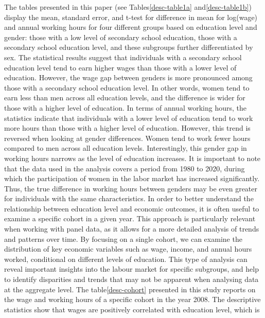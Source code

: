 \documentclass[12pt]{article}
\begin{document}
The tables presented in this paper (see Tables\ref{desc-table1a} and\ref{desc-table1b}) display the mean, standard
error, and t-test for difference in mean for log(wage) and annual working hours for four different groups based on
education level and gender: those with a low level of secondary school education, those with a secondary school
education level, and these subgroups further differentiated by sex. The statistical results suggest that individuals
with a secondary school education level tend to earn higher wages than those with a lower level of education. However,
the wage gap between genders is more pronounced among those with a secondary school education level. In other words,
women tend to earn less than men across all education levels, and the difference is wider for those with a higher level
of education.
\newline
In terms of annual working hours, the statistics indicate that individuals with a lower level of education tend to work
more hours than those with a higher level of education. However, this trend is reversed when looking at gender
differences. Women tend to work fewer hours compared to men across all education levels. Interestingly, this gender gap
in working hours narrows as the level of education increases. It is important to note that the data used in the analysis
covers a period from 1980 to 2020, during which the participation of women in the labor market has increased
significantly. Thus, the true difference in working hours between genders may be even greater for individuals with the
same characteristics.\newline
In order to better understand the relationship between education level and economic outcomes, it is often useful to
examine a specific cohort in a given year. This approach is particularly relevant when working with panel data, as it
allows for a more detailed analysis of trends and patterns over time. By focusing on a single cohort, we can examine the
distribution of key economic variables such as wage, income, and annual hours worked, conditional on different levels of
education. This type of analysis can reveal important insights into the labour market for specific subgroups, and help
to identify disparities and trends that may not be apparent when analysing data at the aggregate level.
\newline
The table\ref{desc-cohort} presented in this study reports on the wage and working hours of a specific cohort in the
year 2008. The descriptive statistics show that wages are positively correlated with education level, which is
\end{document}
